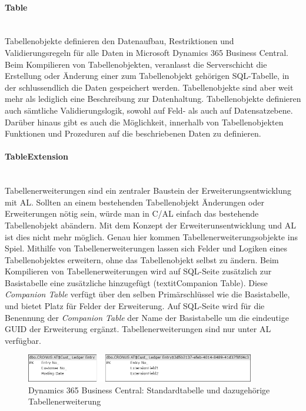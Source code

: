 \paragraph{Table}\mbox{}\\
Tabellenobjekte definieren den Datenaufbau, Restriktionen und Validierungsregeln für alle Daten in Microsoft Dynamics 365 Business Central. Beim Kompilieren von Tabellenobjekten, veranlasst die Serverschicht die Erstellung oder Änderung einer zum Tabellenobjekt gehörigen SQL-Tabelle, in der schlussendlich die Daten gespeichert werden. Tabellenobjekte sind aber weit mehr als lediglich eine Beschreibung zur Datenhaltung. Tabellenobjekte definieren auch sämtliche Validierungslogik, sowohl auf Feld- als auch auf Datensatzebene. Darüber hinaus gibt es auch die Möglichkeit, innerhalb von Tabellenobjekten Funktionen und Prozeduren auf die beschriebenen Daten zu definieren.
\linebreak

\paragraph{TableExtension}\mbox{}\\
Tabellenerweiterungen sind ein zentraler Baustein der Erweiterungsentwicklung mit AL. Sollten an einem bestehenden Tabellenobjekt Änderungen oder Erweiterungen nötig sein, würde man in C/AL einfach das bestehende Tabellenobjekt abändern. Mit dem Konzept der Erweiterunsentwicklung und AL ist dies nicht mehr möglich. Genau hier kommen Tabellenerweiterungsobjekte ins Spiel. Mithilfe von Tabellenerweiterungen lassen sich Felder und Logiken eines Tabellenobjektes erweitern, ohne das Tabellenobjekt selbst zu ändern. Beim Kompilieren von Tabellenerweiterungen wird auf SQL-Seite zusätzlich zur Basistabelle eine zusätzliche hinzugefügt (textit{Companion Table}). Diese \textit{Companion Table} verfügt über den selben Primärschlüssel wie die Basistabelle, und bietet Platz für Felder der Erweiterung. Auf SQL-Seite wird für die Benennung der \textit{Companion Table} der Name der Basistabelle um die eindeutige GUID der Erweiterung ergänzt. Tabellenerweiterungen sind nur unter AL verfügbar.
\begin{figure}[h]
	\centering
	\includegraphics[width=100mm]{images/TableExtenison}
	\caption{Dynamics 365 Business Central: Standardtabelle und dazugehörige Tabellenerweiterung}
	\label{fig:TableExtension}
\end{figure}

